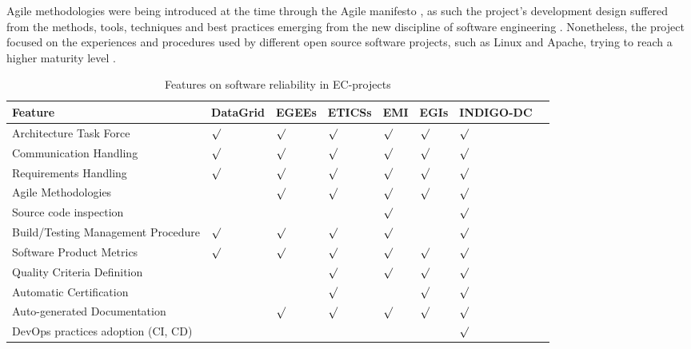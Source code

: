 \documentclass[journal]{IEEEtran}
\begin{document}
Agile methodologies were being introduced at the time
through the Agile manifesto \cite{agile-manifesto}, as such the project's
development design suffered from the methods, tools, techniques and best
practices emerging from the new discipline of software engineering
\cite{agile}. Nonetheless, the project focused on the experiences and procedures
used by different open source software projects, such as Linux and Apache, trying to reach a
higher maturity level \cite{cmm}.

\begin{table}[!h]
\renewcommand{\arraystretch}{1.3}
\caption{Features on software reliability in EC-projects}
\label{tab:feat}
\centering
\begin{adjustbox}{max width=0.5\textwidth}
\begin{tabular}{llllllll}
\hline
\hline
Feature & DataGrid & EGEEs & ETICSs & EMI & EGIs & INDIGO-DC\\
\hline
\hline
Architecture Task Force&$\surd$&$\surd$&$\surd$&$\surd$&$\surd$&$\surd$\\
Communication Handling&$\surd$&$\surd$&$\surd$&$\surd$&$\surd$&$\surd$\\
Requirements Handling&$\surd$&$\surd$&$\surd$&$\surd$&$\surd$&$\surd$\\
Agile Methodologies&&$\surd$&$\surd$&$\surd$&$\surd$&$\surd$\\
Source code inspection&&&&$\surd$&&$\surd$\\
Build/Testing Management Procedure&$\surd$&$\surd$&$\surd$&$\surd$&&$\surd$\\
Software Product Metrics&$\surd$&$\surd$&$\surd$&$\surd$&$\surd$&$\surd$\\
Quality Criteria Definition&&&$\surd$&$\surd$&$\surd$&$\surd$\\
Automatic Certification&&&$\surd$&&$\surd$&$\surd$\\
Auto-generated Documentation&&$\surd$&$\surd$&$\surd$&$\surd$&$\surd$\\
DevOps practices adoption (CI, CD)&&&&&&$\surd$\\
\hline
\hline
\end{tabular}
\end{adjustbox}
\end{table}
\end{document}
